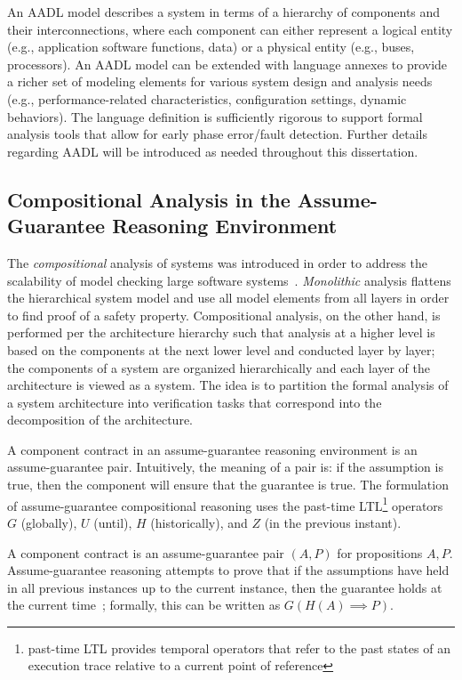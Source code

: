 An AADL model describes a system in terms of a hierarchy of components and their interconnections, where each component can either represent a logical entity (e.g., application software functions, data) or a physical entity (e.g., buses, processors). An AADL model can be extended with language annexes to provide a richer set of modeling elements for various system design and analysis needs (e.g., performance-related characteristics, configuration settings, dynamic behaviors). The language definition is sufficiently rigorous to support formal analysis tools that allow for early phase error/fault detection. Further details regarding AADL will be introduced as needed throughout this dissertation. 

\subsection{Compositional Analysis in the Assume-Guarantee Reasoning Environment}
The {\em compositional} analysis of systems was introduced in order to address the scalability of model checking large software systems~\cite{pnueli1985transition, heckel1998compositional, NFM2012:CoGaMiWhLaLu}. {\em Monolithic} analysis flattens the hierarchical system model and use all model elements from all layers in order to find proof of a safety property. Compositional analysis, on the other hand, is performed per the architecture hierarchy such that analysis at a higher level is based on the components at the next lower level and conducted layer by layer; the components of a system are organized hierarchically and each layer of the architecture is viewed as a system. The idea is to partition the formal analysis of a system architecture into verification tasks that correspond into the decomposition of the architecture. 

A component contract in an assume-guarantee reasoning environment is an assume-guarantee pair. Intuitively, the meaning of a pair is: if the assumption is true, then the component will ensure that the guarantee is true. The formulation of assume-guarantee compositional reasoning  uses the past-time LTL\footnote{past-time LTL provides temporal operators that refer to the past states of an execution trace relative to a current point of reference} operators $G$ (globally), $U$ (until), $H$ (historically), and $Z$ (in the previous instant).

A component contract is an assume-guarantee pair $(A,P)$ for propositions $A, P$. Assume-guarantee reasoning attempts to prove that if the assumptions have held in all previous instances up to the current instance, then the guarantee holds at the current time~\cite{cofer2012compositional}; formally, this can be written as $G(H(A) \implies P)$. 

